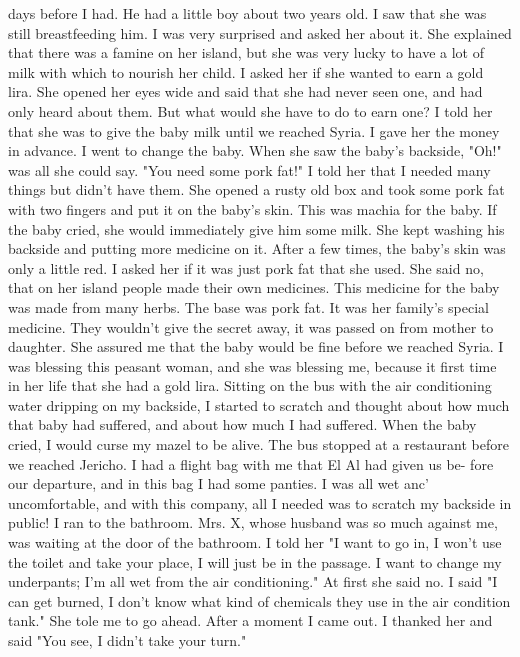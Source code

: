 days before I had.
He had a little boy about two years old.
I saw that 
she was still breastfeeding him.
I was very surprised and asked her about 
it.
She explained that there was a famine on her island, but she was very 
lucky to have a lot of milk with which to nourish her child.
I asked her 
if she wanted to earn a gold lira.
She opened her eyes wide and said that 
she had never seen one, and had only heard about them.
But what would 
she have to do to earn one?
I told her that she was to give the baby milk 
until we reached Syria.
I gave her the money in advance.
I went to change the baby.
When 
she saw the baby's backside, "Oh!"
was all she could say.
"You need some 
pork fat!"
I told her that I needed many things but didn't have them.
She opened a rusty old box and took some pork fat with two fingers and put 
it on the baby's skin.
This was machia for the baby.
If the baby cried, she would immediately give him some milk.
She 
kept washing his backside and putting more medicine on it.
After a few 
times, the baby's skin was only a little red.
I asked her if it was just 
pork fat that she used.
She said no, that on her island people made their own medicines.
This medicine for the baby was made from many herbs.
The 
base was pork fat.
It was her family's special medicine.
They wouldn't 
give the secret away, it was passed on from mother to daughter.
She assured me that the baby would be fine before we reached Syria.
I was blessing this peasant woman, and she was blessing me, because it 
first time in her life that she had a gold lira.
Sitting on the bus with the air conditioning water dripping on my 
backside, I started to scratch and thought about how much that baby had 
suffered, and about how much I had suffered.
When the baby cried, I would 
curse my mazel to be alive.
The bus stopped at a restaurant before we 
reached Jericho.
I had a flight bag with me that El Al had given us be-
fore our departure, and in this bag I had some panties.
I was all wet anc' 
uncomfortable, and with this company, all I needed was to scratch my backside in public!
I ran to the bathroom.
Mrs.
X, whose husband was so 
much against me, was waiting at the door of the bathroom.
I told her "I 
want to go in, I won't use the toilet and take your place, I will just be 
in the passage.
I want to change my underpants; I'm all wet from the air 
conditioning."
At first she said no.
I said "I can get burned, I don't 
know what kind of chemicals they use in the air condition tank."
She tole 
me to go ahead.
After a moment I came out.
I thanked her and said "You 
see, I didn't take your turn."
